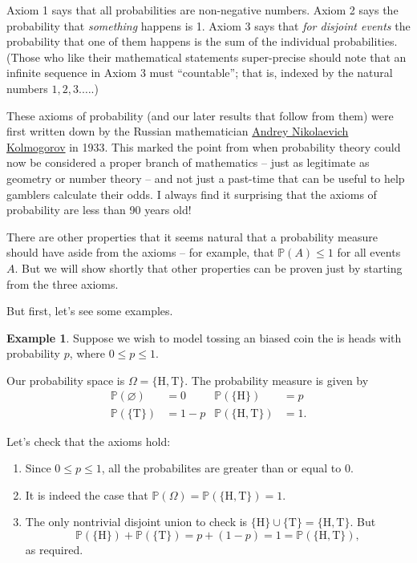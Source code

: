 \documentclass[
  a4paper,
]{book}
\providecommand{\tightlist}{%
  \setlength{\itemsep}{0pt}\setlength{\parskip}{0pt}}
\theoremstyle{definition}
\theoremstyle{definition}
\newtheorem{example}{Example}[chapter]
\theoremstyle{definition}
\theoremstyle{definition}
\theoremstyle{remark}
\begin{document}
Axiom 1 says that all probabilities are non-negative numbers. Axiom 2 says the probability that \emph{something} happens is 1. Axiom 3 says that \emph{for disjoint events} the probability that one of them happens is the sum of the individual probabilities. (Those who like their mathematical statements super-precise should note that an infinite sequence in Axiom 3 must ``countable''; that is, indexed by the natural numbers \(1, 2, 3. \dots\).)

These axioms of probability (and our later results that follow from them) were first written down by the Russian mathematician \href{https://mathshistory.st-andrews.ac.uk/Biographies/Kolmogorov/}{Andrey Nikolaevich Kolmogorov} in 1933. This marked the point from when probability theory could now be considered a proper branch of mathematics -- just as legitimate as geometry or number theory -- and not just a past-time that can be useful to help gamblers calculate their odds. I always find it surprising that the axioms of probability are less than 90 years old!

There are other properties that it seems natural that a probability measure should have aside from the axioms -- for example, that \(\mathbb P(A) \leq 1\) for all events \(A\). But we will show shortly that other properties can be proven just by starting from the three axioms.

But first, let's see some examples.

\begin{example}

Suppose we wish to model tossing an biased coin the is heads with probability \(p\), where \(0 \leq p \leq 1\).

Our probability space is \(\Omega = \{\text{H}, \text{T}\}\). The probability measure is given by
\begin{align*}
   \mathbb P(\varnothing) &= 0  &  \mathbb P(\{\text{H}\}) &= p \\
   \mathbb P(\{\text{T}\}) &= 1 - p  &  \mathbb P(\{\text{H},\text{T}\})  &= 1 .
\end{align*}

Let's check that the axioms hold:

\begin{enumerate}
\def\labelenumi{\arabic{enumi}.}
\tightlist
\item
  Since \(0 \leq p \leq 1\), all the probabilites are greater than or equal to 0.
\item
  It is indeed the case that \(\mathbb P(\Omega) = \mathbb P(\{\text{H},\text{T}\}) = 1\).
\item
  The only nontrivial disjoint union to check is \(\{\text{H}\} \cup \{\text{T}\} = \{\text{H},\text{T}\}\). But
  \[ \mathbb P(\{\text{H}\}) + \mathbb P(\{\text{T}\}) = p + (1 - p) = 1 = \mathbb P(\{\text{H},\text{T}\}) , \]
  as required.
\end{enumerate}

\end{example}
\end{document}
